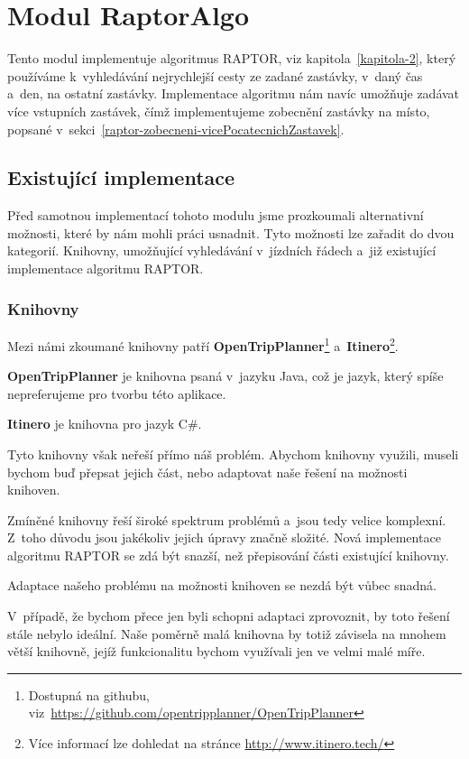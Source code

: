 \section{Modul RaptorAlgo}

Tento modul implementuje algoritmus RAPTOR, viz kapitola~\ref{kapitola-2}, který používáme k~vyhledávání nejrychlejší cesty ze zadané zastávky, v~daný čas a~den, na ostatní zastávky. Implementace algoritmu nám navíc umožňuje zadávat více vstupních zastávek, čímž implementujeme zobecnění zastávky na místo, popsané v~sekci~\ref{raptor-zobecneni-vicePocatecnichZastavek}.


\subsection{Existující implementace}

Před samotnou implementací tohoto modulu jsme prozkoumali alternativní možnosti, které by nám mohli práci usnadnit. Tyto možnosti lze zařadit do dvou kategorií. Knihovny, umožňující vyhledávání v~jízdních řádech a~již existující implementace algoritmu RAPTOR.

\subsubsection{Knihovny}

Mezi námi zkoumané knihovny patří \textbf{OpenTripPlanner}\footnote{Dostupná na githubu, viz~\url{https://github.com/opentripplanner/OpenTripPlanner}} a~\textbf{Itinero}\footnote{Více informací lze dohledat na stránce \url{http://www.itinero.tech/}}.

\textbf{OpenTripPlanner} je knihovna psaná v~jazyku Java, což je jazyk, který spíše nepreferujeme pro tvorbu této aplikace.

\textbf{Itinero} je knihovna pro jazyk C\#.

Tyto knihovny však neřeší přímo náš problém. Abychom knihovny využili, museli bychom buď přepsat jejich část, nebo adaptovat naše řešení na možnosti knihoven.

Zmíněné knihovny řeší široké spektrum problémů a~jsou tedy velice komplexní. Z~toho důvodu jsou jakékoliv jejich úpravy značně složité. Nová implementace algoritmu RAPTOR se zdá být snazší, než přepisování části existující knihovny.

Adaptace našeho problému na možnosti knihoven se nezdá být vůbec snadná.

V~případě, že bychom přece jen byli schopni adaptaci zprovoznit, by toto řešení stále nebylo ideální. Naše poměrně malá knihovna by totiž závisela na mnohem větší knihovně, jejíž funkcionalitu bychom využívali jen ve velmi malé míře.

